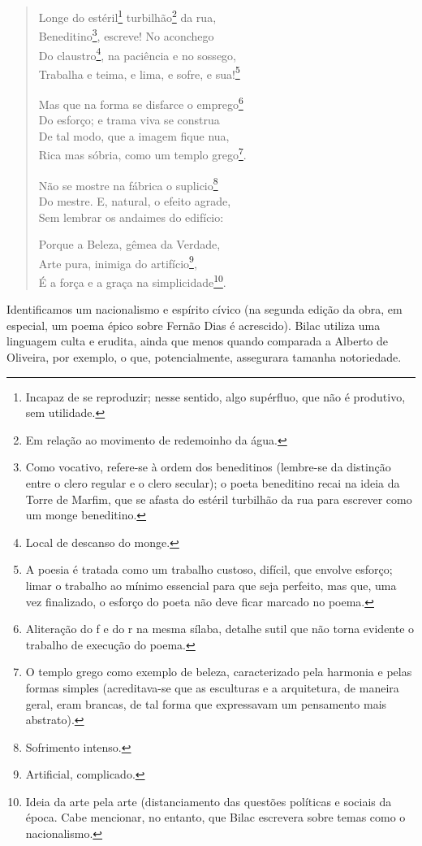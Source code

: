 \begin{verse}
Longe do estéril\footnote{Incapaz de se reproduzir; nesse sentido, algo supérfluo, que não é produtivo, sem utilidade.} turbilhão\footnote{Em relação ao movimento de redemoinho da água.} da rua, \\
Beneditino\footnote{Como vocativo, refere-se à ordem dos beneditinos (lembre-se da distinção entre o clero regular e o clero secular); o poeta beneditino recai na ideia da Torre de Marfim, que se afasta do estéril turbilhão da rua para escrever como um monge beneditino.}, escreve! No aconchego \\
Do claustro\footnote{Local de descanso do monge. }, na paciência e no sossego, \\
Trabalha e teima, e lima, e sofre, e sua!\footnote{A poesia é tratada como um trabalho custoso, difícil, que envolve esforço; limar o trabalho ao mínimo essencial para que seja perfeito, mas que, uma vez finalizado, o esforço do poeta não deve ficar marcado no poema.}

Mas que na forma se disfarce o emprego\footnote{Aliteração do f e do r na mesma sílaba, detalhe sutil que não torna evidente o trabalho de execução do poema.} \\
Do esforço; e trama viva se construa \\
De tal modo, que a imagem fique nua, \\
Rica mas sóbria, como um templo grego\footnote{O templo grego como exemplo de beleza, caracterizado pela harmonia e pelas formas simples (acreditava-se que as esculturas e a arquitetura, de maneira geral, eram brancas, de tal forma que expressavam um pensamento mais abstrato).}.

Não se mostre na fábrica o suplicio\footnote{Sofrimento intenso.} \\
Do mestre. E, natural, o efeito agrade, \\
Sem lembrar os andaimes do edifício:

Porque a Beleza, gêmea da Verdade, \\
Arte pura, inimiga do artifício\footnote{Artificial, complicado.}, \\
É a força e a graça na simplicidade\footnote{Ideia da arte pela arte (distanciamento das questões políticas e sociais da época. Cabe mencionar, no entanto, que Bilac escrevera sobre temas como o nacionalismo.}.
\end{verse}

Identificamos um nacionalismo e espírito cívico (na segunda edição da obra, em especial, um poema épico sobre Fernão Dias é acrescido). Bilac utiliza uma linguagem culta e erudita, ainda que menos quando comparada a Alberto de Oliveira, por exemplo, o que, potencialmente, assegurara tamanha notoriedade.

